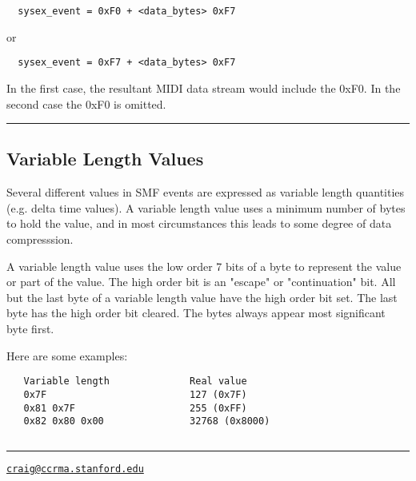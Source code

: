 \texttt{\ \ sysex\_event\ =\ 0xF0\ +\ \textless{}data\_bytes\textgreater{}\ 0xF7\ }

or

\texttt{\ \ sysex\_event\ =\ 0xF7\ +\ \textless{}data\_bytes\textgreater{}\ 0xF7\ \ }

In the first case, the resultant MIDI data stream would include the
0xF0. In the second case the 0xF0 is omitted.

\begin{center}\rule{0.5\linewidth}{0.5pt}\end{center}

\protect\hypertarget{variable_length}{}{}

\hypertarget{variable-length-values}{%
\subsection*{Variable Length Values}\label{variable-length-values}}

Several different values in SMF events are expressed as variable length
quantities (e.g. delta time values). A variable length value uses a
minimum number of bytes to hold the value, and in most circumstances
this leads to some degree of data compresssion.

A variable length value uses the low order 7 bits of a byte to represent
the value or part of the value. The high order bit is an "escape" or
"continuation" bit. All but the last byte of a variable length value
have the high order bit set. The last byte has the high order bit
cleared. The bytes always appear most significant byte first.

Here are some examples:

\begin{verbatim}
   Variable length              Real value
   0x7F                         127 (0x7F)
   0x81 0x7F                    255 (0xFF)
   0x82 0x80 0x00               32768 (0x8000)
\end{verbatim}

\begin{verbatim}
\end{verbatim}

\begin{center}\rule{0.5\linewidth}{0.5pt}\end{center}

\href{craig@ccrma.stanford.edu}{\texttt{\small craig@ccrma.stanford.edu}}

